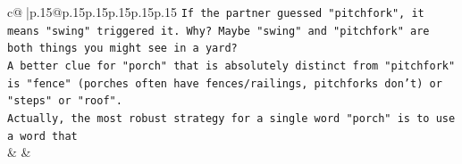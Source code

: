 \documentclass{article}
\begin{document}
{\begin{supertabular}{c@{$\;$}|p{.15\linewidth}@{}p{.15\linewidth}p{.15\linewidth}p{.15\linewidth}p{.15\linewidth}p{.15\linewidth}}
{{{\texttt{If the partner guessed "pitchfork", it means "swing" triggered it. Why? Maybe "swing" and "pitchfork" are both things you might see in a yard?} \\
\texttt{A better clue for "porch" that is absolutely distinct from "pitchfork" is "fence" (porches often have fences/railings, pitchforks don't) or "steps" or "roof".} \\
\texttt{Actually, the most robust strategy for a single word "porch" is to use a word that} \\
            }
        }
    }
    & & \\ \\

\end{supertabular}
}
\end{document}
